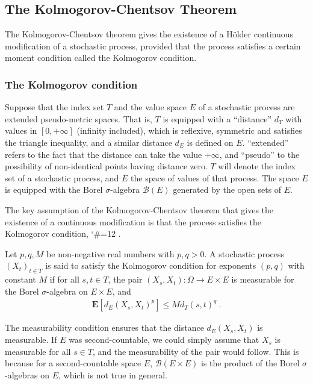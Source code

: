 \documentclass[lean]{Draft}
\makeatletter
\newcommand\leanlink{\begingroup\catcode`\#=12\relax\@leanlink}
\newcommand\@leanlink[2]{\endgroup
\href{#1}
{\texttt{\detokenize{#2}}}}
\newcommand{\mllink}[3]{%
\leanlink{https://github.com/leanprover-community/mathlib4/blob/6135ffb78e8bcd3fcc8ec02f3f82ea0b0737358b/Mathlib/#1.lean\##2}
{#3}}
\makeatother
\begin{document}
\subsection{The Kolmogorov-Chentsov Theorem}
\label{S:continuity}

The Kolmogorov-Chentsov theorem gives the existence of a Hölder continuous modification of a stochastic process, provided that the process satisfies a certain moment condition called the Kolmogorov condition.


\subsubsection{The Kolmogorov condition}

Suppose that the index set $T$ and the value space $E$ of a stochastic process are extended pseudo-metric spaces.
That is, $T$ is equipped with a ``distance'' $d_T$ with values in $[0,+\infty]$ (infinity included), which is reflexive, symmetric and satisfies the triangle inequality, and a similar distance $d_E$ is defined on $E$. ``extended'' refers to the fact that the distance can take the value $+\infty$, and ``pseudo'' to the possibility of non-identical points having distance zero.
$T$ will denote the index set of a stochastic process, and $E$ the space of values of that process.
The space $E$ is equipped with the Borel $\sigma$-algebra $\mathcal{B}(E)$ generated by the open sets of $E$.

The key assumption of the Kolmogorov-Chentsov theorem that gives the existence of a continuous modification is that the process satisfies the Kolmogorov condition, \mllink{Probability/Process/Kolmogorov}{L52-L60}{ProbabilityTheory.IsKolmogorovProcess}.

\begin{definition}\label{def:kolmogorov_condition}
Let $p, q, M$ be non-negative real numbers with $p,q>0$.
A stochastic process $(X_t)_{t \in T}$ is said to satisfy the Kolmogorov condition for exponents $(p, q)$ with constant $M$ if for all $s, t \in T$, the pair $(X_s, X_t) : \Omega \to E \times E$ is measurable for the Borel $\sigma$-algebra on $E \times E$, and
\begin{align*}
  \mathbf{E}[d_E(X_s, X_t)^p] \le M d_T(s, t)^q
  \: .
\end{align*}
\end{definition}

The measurability condition ensures that the distance $d_E(X_s, X_t)$ is measurable.
If $E$ was second-countable, we could simply assume that $X_s$ is measurable for all $s \in T$, and the measurability of the pair would follow.
This is because for a second-countable space $E$, $\mathcal{B}(E \times E)$ is the product of the Borel $\sigma$-algebras on $E$, which is not true in general.
\end{document}
